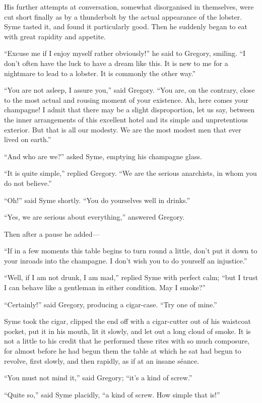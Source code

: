 His further attempts at conversation, somewhat disorganised in themselves, were cut short finally as by a thunderbolt by the actual appearance of the lobster. Syme tasted it, and found it particularly good. Then he suddenly began to eat with great rapidity and appetite.

“Excuse me if I enjoy myself rather obviously!” he said to Gregory, smiling. “I don’t often have the luck to have a dream like this. It is new to me for a nightmare to lead to a lobster. It is commonly the other way.”

“You are not asleep, I assure you,” said Gregory. “You are, on the contrary, close to the most actual and rousing moment of your existence. Ah, here comes your champagne! I admit that there may be a slight disproportion, let us say, between the inner arrangements of this excellent hotel and its simple and unpretentious exterior. But that is all our modesty. We are the most modest men that ever lived on earth.”

“And who are we?” asked Syme, emptying his champagne glass.

“It is quite simple,” replied Gregory. “We are the serious anarchists, in whom you do not believe.”

“Oh!” said Syme shortly. “You do yourselves well in drinks.”

“Yes, we are serious about everything,” answered Gregory.

Then after a pause he added⁠—

“If in a few moments this table begins to turn round a little, don’t put it down to your inroads into the champagne. I don’t wish you to do yourself an injustice.”

“Well, if I am not drunk, I am mad,” replied Syme with perfect calm; “but I trust I can behave like a gentleman in either condition. May I smoke?”

“Certainly!” said Gregory, producing a cigar-case. “Try one of mine.”

Syme took the cigar, clipped the end off with a cigar-cutter out of his waistcoat pocket, put it in his mouth, lit it slowly, and let out a long cloud of smoke. It is not a little to his credit that he performed these rites with so much composure, for almost before he had begun them the table at which he sat had begun to revolve, first slowly, and then rapidly, as if at an insane séance.

“You must not mind it,” said Gregory; “it’s a kind of screw.”

“Quite so,” said Syme placidly, “a kind of screw. How simple that is!”

